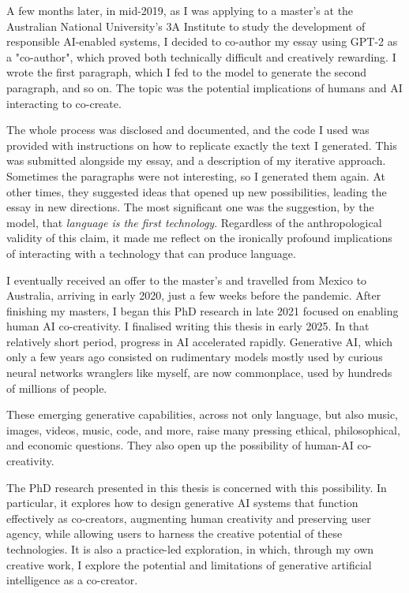 A few months later, in mid-2019, as I was applying to a master’s at the Australian National University’s 3A Institute to study the development of responsible AI-enabled systems, I decided to co-author my essay using GPT-2 as a "co-author", which proved both technically difficult and creatively rewarding. I wrote the first paragraph, which I fed to the model to generate the second paragraph, and so on. The topic was the potential implications of humans and AI interacting to co-create.

The whole process was disclosed and documented, and the code I used was provided with instructions on how to replicate exactly the text I generated. This was submitted alongside my essay, and a description of my iterative approach. Sometimes the paragraphs were not interesting, so I generated them again. At other times, they suggested ideas that opened up new possibilities, leading the essay in new directions. The most significant one was the suggestion, by the model, that \textit{language is the first technology}. Regardless of the anthropological validity of this claim, it made me reflect on the ironically profound implications of interacting with a technology that can produce language.

I eventually received an offer to the master’s and travelled from Mexico to Australia, arriving in early 2020, just a few weeks before the pandemic. After finishing my masters, I began this PhD research in late 2021 focused on enabling human AI co-creativity. I finalised writing this thesis in early 2025. In that relatively short period, progress in AI accelerated rapidly. Generative AI, which only a few years ago consisted on rudimentary models mostly used by curious neural networks wranglers like myself, are now commonplace, used by hundreds of millions of people.

These emerging generative capabilities, across not only language, but also music, images, videos, music, code, and more, raise many pressing ethical, philosophical, and economic questions. They also open up the possibility of human-AI co-creativity.

The PhD research presented in this thesis is concerned with this possibility. In particular, it explores how to design generative AI systems that function effectively as co-creators, augmenting human creativity and preserving user agency, while allowing users to harness the creative potential of these technologies. It is also a practice-led exploration, in which, through my own creative work, I explore the potential and limitations of generative artificial intelligence as a co-creator. 

